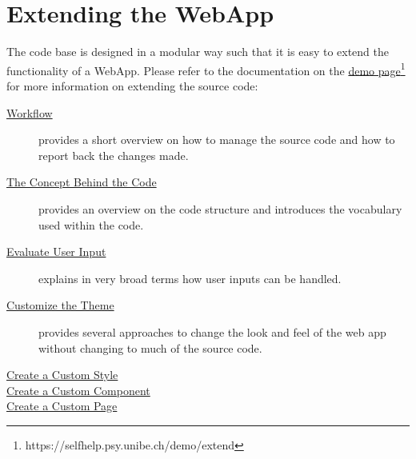 \documentclass[a4paper,oneside]{book}
\begin{document}
\chapter{Extending the WebApp}\label{sec.extend}
The code base is designed in a modular way such that it is easy to extend the functionality of a WebApp.
Please refer to the documentation on the \href{https://selfhelp.psy.unibe.ch/demo/extend}{demo page}\footnote{https://selfhelp.psy.unibe.ch/demo/extend} for more information on extending the source code:

\begin{description}
    \item[\href{https://selfhelp.psy.unibe.ch/demo/extend/432}{Workflow}] provides a short overview on how to manage the source code and how to report back the changes made.
    \item[\href{https://selfhelp.psy.unibe.ch/demo/extend/416}{The Concept Behind the Code}] provides an overview on the code structure and introduces the vocabulary used within the code.
    \item[\href{https://selfhelp.psy.unibe.ch/demo/extend/417}{Evaluate User Input}] explains in very broad terms how user inputs can be handled.
    \item[\href{https://selfhelp.psy.unibe.ch/demo/extend/419}{Customize the Theme}] provides several approaches to change the look and feel of the web app without changing to much of the source code.
    \item[\href{https://selfhelp.psy.unibe.ch/demo/extend/418}{Create a Custom Style}]
    \item[\href{https://selfhelp.psy.unibe.ch/demo/extend/420}{Create a Custom Component}]
    \item[\href{https://selfhelp.psy.unibe.ch/demo/extend/421}{Create a Custom Page}]
\end{description}
\end{document}
